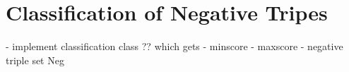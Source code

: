 \section{Classification of Negative Tripes}
\label{sec:classification}




- implement classification class ?? which gets
    - minscore
    - maxscore
    - negative triple set Neg